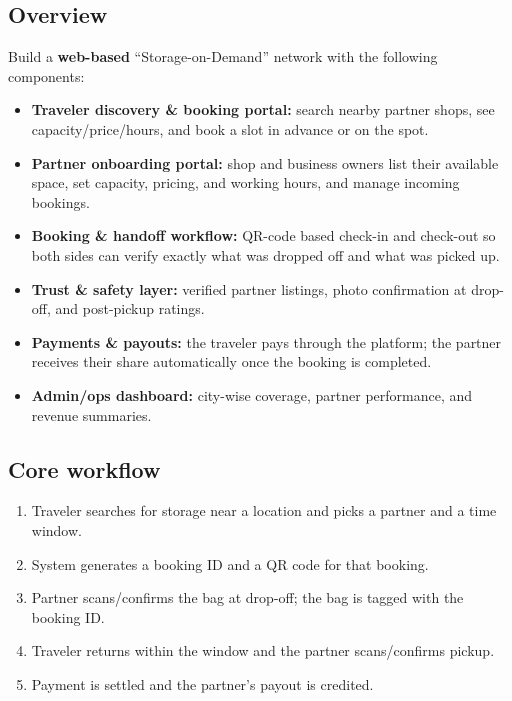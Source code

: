 \documentclass[11pt,a4paper]{article}
\begin{document}
\subsection{Overview}
Build a \textbf{web-based} ``Storage-on-Demand'' network with the following components:
\begin{itemize}[leftmargin=0.7cm]
    \item \textbf{Traveler discovery \& booking portal:} search nearby partner shops, see capacity/price/hours, and book a slot in advance or on the spot.
    \item \textbf{Partner onboarding portal:} shop and business owners list their available space, set capacity, pricing, and working hours, and manage incoming bookings.
    \item \textbf{Booking \& handoff workflow:} QR-code based check-in and check-out so both sides can verify exactly what was dropped off and what was picked up.
    \item \textbf{Trust \& safety layer:} verified partner listings, photo confirmation at drop-off, and post-pickup ratings.
    \item \textbf{Payments \& payouts:} the traveler pays through the platform; the partner receives their share automatically once the booking is completed.
    \item \textbf{Admin/ops dashboard:} city-wise coverage, partner performance, and revenue summaries.
\end{itemize}

\subsection{Core workflow}
\begin{enumerate}[leftmargin=0.7cm]
    \item Traveler searches for storage near a location and picks a partner and a time window.
    \item System generates a booking ID and a QR code for that booking.
    \item Partner scans/confirms the bag at drop-off; the bag is tagged with the booking ID.
    \item Traveler returns within the window and the partner scans/confirms pickup.
    \item Payment is settled and the partner's payout is credited.
\end{enumerate}
\end{document}
